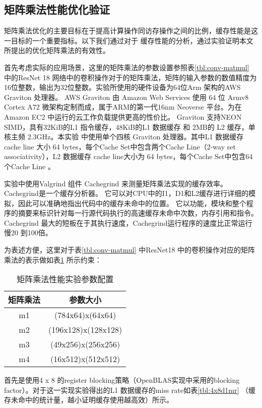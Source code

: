 \subsection{矩阵乘法性能优化验证}

矩阵乘法优化的主要目标在于提高计算操作同访存操作之间的比例，缓存性能是这一目标的一个重要指标。以下我们通过对于
缓存性能的分析，通过实验证明本文所提出的优化矩阵乘法的有效性。

首先考虑实际的应用场景，这里的矩阵乘法的参数设置参照表\ref{tbl:conv-matmul} 中的ResNet 18 网络中的卷积操作对于的矩阵乘法，矩阵的输入参数的数值精度为16位整数，输出为32位整数。实验所使用的硬件设备为64位Arm 架构的AWS Graviton 处理器。
AWS Graviton 由 Amazon Web Services 使用 64 位 Armv8 Cortex A72 微架构定制而成，属于ARM的第一代16nm Neoverse 平台。为在 Amazon EC2 中运行的云工作负载提供更高的性价比。
Graviton 支持NEON SIMD，具有32KiB的L1 指令缓存，48KiB的L1 数据缓存 和 2MB的 L2 缓存，单核主频 2.3GHz。本实验
中使用单个四核 Graviton 处理器。其中L1 数据缓存cache line 大小 64 bytes，每个Cache Set中包含两个Cache Line（2-way set associativity），L2 数据缓存 cache line大小为 64 bytes，每个Cache Set中包含64个Cache Line 。

实验中使用Valgrind 组件 Cachegrind 来测量矩阵乘法实现的缓存效率。Cachegrind是一个缓存分析器。 它可以对CPU中的I1，D1和L2缓存进行详细的模拟，因此可以准确地指出代码中的缓存未命中的位置。 它以功能，模块和整个程序的摘要来标识针对每一行源代码执行的高速缓存未命中次数，内存引用和指令。 Cachegrind 最大的短板在于其执行速度，Cachegrind运行程序的速度比正常运行慢20 到100倍。

为表述方便，这里对于表\ref{tbl:conv-matmul} 中ResNet18 中的卷积操作对应的矩阵乘法的表示做如表\ref{tbl:matmul-anno} 所示约束：

\begin{table}[]
  \centering
  \caption{矩阵乘法性能实验参数配置}
  \begin{tabular}{cc}
    \toprule
    矩阵乘法 & 参数大小\\
    \midrule
    m1  & (784x64)x(64x64)\\
    m2  & (196x128)x(128x128)\\
    m3  & (49x256)x(256x256)\\
    m4  & (16x512)x(512x512)\\
    \bottomrule
  \end{tabular}
  \label{tbl:matmul-anno}
\end{table}

首先是使用4 x 8 的register blocking策略（OpenBLAS实现中采用的blocking factor）。对于这一实现实验得出的L1 数据缓存的miss rate如表\ref{tbl:4x8d1mr} （缓存未命中的统计量，越小证明缓存使用越高效）所示。

